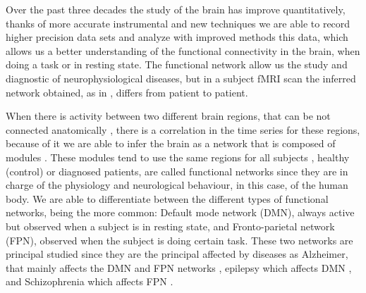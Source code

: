 \documentclass[a4paper,12pt]{article}
\begin{document}
Over the past three decades the study of the brain has improve quantitatively, thanks of more accurate instrumental and new techniques we are able to record higher precision data sets and analyze with improved methods this data, which allows us a better understanding of the functional connectivity in the brain, when doing a task or in resting state.
The functional network allow us the study and diagnostic of neurophysiological diseases, but in a subject fMRI scan the inferred network obtained, as in \cite{Gordon2017}, differs from patient to patient. 

When there is activity between two different brain regions, that can be not connected anatomically \cite{Rubinov2010},   there is a correlation in the time series for these regions, because of it we are able to infer the brain as a network that is composed of modules \cite{He2009}.
These modules tend to use the same regions for all subjects \cite{Damoiseaux2006}, healthy (control) or diagnosed patients, are called functional networks since they are in charge of the physiology and neurological behaviour, in this case, of the human body.
We are able to differentiate between the different types of functional networks, being the more common: Default mode network (DMN), always active but observed when a subject is in resting state, and Fronto-parietal network (FPN), observed when the subject is doing certain task. These two networks are principal studied since they are the principal affected by diseases as Alzheimer, that mainly affects the DMN and FPN networks \cite{Zanchi2018} \cite{Mohan2016}, epilepsy which affects DMN \cite{Mohan2016}, and Schizophrenia which affects FPN \cite{Ray2017}.
\end{document}
